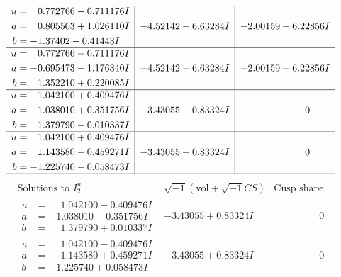 \documentclass[1p]{elsarticle_modified}
\theoremstyle{definition}
\newcommand{\I}{\sqrt{-1}}
\begin{document}
$$\begin{array}{c|c|c}
\begin{aligned}
u &= \phantom{-}0.772766 - 0.711176 I \\
a &= \phantom{-}0.805503 + 1.026110 I \\
b &= -1.37402 - 0.41443 I\end{aligned}
 & -4.52142 - 6.63284 I & -2.00159 + 6.22856 I \\ \hline\begin{aligned}
u &= \phantom{-}0.772766 - 0.711176 I \\
a &= -0.695473 - 1.176340 I \\
b &= \phantom{-}1.352210 + 0.220085 I\end{aligned}
 & -4.52142 - 6.63284 I & -2.00159 + 6.22856 I \\ \hline\begin{aligned}
u &= \phantom{-}1.042100 + 0.409476 I \\
a &= -1.038010 + 0.351756 I \\
b &= \phantom{-}1.379790 - 0.010337 I\end{aligned}
 & -3.43055 - 0.83324 I & \phantom{-0.000000 } 0 \\ \hline\begin{aligned}
u &= \phantom{-}1.042100 + 0.409476 I \\
a &= \phantom{-}1.143580 - 0.459271 I \\
b &= -1.225740 - 0.058473 I\end{aligned}
 & -3.43055 - 0.83324 I & \phantom{-0.000000 } 0\\
 \hline 
 \end{array}$$\newpage$$\begin{array}{c|c|c}  
\text{Solutions to }I^u_{2}& \I (\text{vol} + \sqrt{-1}CS) & \text{Cusp shape}\\
 \hline 
\begin{aligned}
u &= \phantom{-}1.042100 - 0.409476 I \\
a &= -1.038010 - 0.351756 I \\
b &= \phantom{-}1.379790 + 0.010337 I\end{aligned}
 & -3.43055 + 0.83324 I & \phantom{-0.000000 } 0 \\ \hline\begin{aligned}
u &= \phantom{-}1.042100 - 0.409476 I \\
a &= \phantom{-}1.143580 + 0.459271 I \\
b &= -1.225740 + 0.058473 I\end{aligned}
 & -3.43055 + 0.83324 I & \phantom{-0.000000 } 0 \\ \hline\begin{aligned}

\end{aligned}
\end{array}$$
\end{document}
